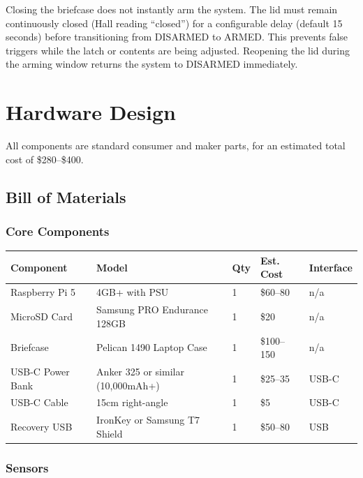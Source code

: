\documentclass[11pt,letterpaper]{article}
\begin{document}
Closing the briefcase does not instantly arm the system. The lid must remain continuously closed (Hall reading ``closed'') for a configurable delay (default 15 seconds) before transitioning from DISARMED to ARMED. This prevents false triggers while the latch or contents are being adjusted. Reopening the lid during the arming window returns the system to DISARMED immediately.


\section{Hardware Design}

All components are standard consumer and maker parts, for an estimated total cost of \$280--\$400.

\subsection{Bill of Materials}

\subsubsection{Core Components}

{\centering\begin{tabularx}{\textwidth}{Y L{4.8cm} L{0.9cm} L{2.3cm} L{2.0cm}}
\toprule
\textbf{Component} & \textbf{Model} & \textbf{Qty} & \textbf{Est. Cost} & \textbf{Interface} \\
\midrule
Raspberry Pi 5 & 4GB+ with PSU & 1 & \$60--80 & n/a \\
MicroSD Card & Samsung PRO Endurance 128GB & 1 & \$20 & n/a \\
Briefcase & Pelican 1490 Laptop Case & 1 & \$100--150 & n/a \\
USB-C Power Bank & Anker 325 or similar (10,000mAh+) & 1 & \$25--35 & USB-C \\
USB-C Cable & 15cm right-angle & 1 & \$5 & USB-C \\
Recovery USB & IronKey or Samsung T7 Shield & 1 & \$50--80 & USB \\
\bottomrule
\end{tabularx}\par}

\subsubsection{Sensors}
\end{document}
